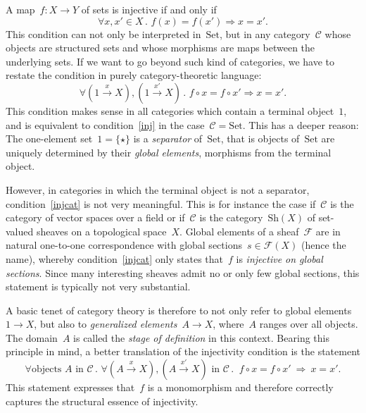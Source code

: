 \documentclass[10pt,reqno,a4paper]{amsbook}
\theoremstyle{definition}
\theoremstyle{plain}
\theoremstyle{remark}
\newcommand{\C}{\mathcal{C}}
\newcommand{\F}{\mathcal{F}}
\newcommand{\Set}{\mathrm{Set}}
\newcommand{\Sh}{\mathrm{Sh}}
\newcommand{\?}{\,{:}\,}
\renewcommand{\_}{\mathpunct{.}\,}
\newcommand{\xra}{\xrightarrow}
\begin{document}
A map~$f : X \to Y$ of sets is injective if and only if
\begin{equation}\label{inj}
  \forall x,x' \in X\_ f(x) = f(x') \Longrightarrow x = x'.
\end{equation}
This condition can not only be interpreted in~$\Set$, but in any category~$\C$ whose
objects are structured sets and whose morphisms are maps between the underlying
sets. If we want to go beyond such kind of categories, we have to restate the
condition in purely category-theoretic language:
\begin{equation}\label{injcat}
  \forall (1 \xra{x} X), (1 \xra{x'} X)\_ f \circ x = f \circ x'
  \Longrightarrow x = x'.
\end{equation}
This condition makes sense in all categories which contain a terminal
object~$1$, and is equivalent to condition~\eqref{inj} in the case~$\C = \Set$.
This has a deeper reason: The one-element set~$1 = \{ \star \}$ is a
\emph{separator} of~$\Set$, that is objects of~$\Set$ are uniquely determined
by their \emph{global elements}, morphisms from the terminal object.

However, in categories in which the terminal object is not a separator,
condition~\eqref{injcat} is not very meaningful. This is for instance the case
if~$\C$ is the category of vector spaces over a field or if~$\C$ is the category~$\Sh(X)$ of set-valued sheaves on a topological
space~$X$. Global elements of a sheaf~$\F$ are in natural one-to-one
correspondence with global sections~$s \in \F(X)$ (hence the name), whereby
condition~\eqref{injcat} only states that~$f$ is \emph{injective on global
sections}. Since many interesting sheaves admit no or only few global sections,
this statement is typically not very substantial.

A basic tenet of category theory is therefore to not only refer to global
elements~$1 \to X$, but also to \emph{generalized elements}~$A \to X$,
where~$A$ ranges over all objects. The domain~$A$ is called the \emph{stage of
definition} in this context. Bearing this principle in mind, a better
translation of the injectivity condition is the statement
\begin{equation}\label{injgen}
  \forall \text{objects $A$ in~$\C$}\_ \forall (A \xra{x} X), (A \xra{x'\!} X) \text{ in~$\C$}\_\
  f \circ x = f \circ x' \ \Longrightarrow\ x = x'.
\end{equation}
This statement expresses that~$f$ is a monomorphism and therefore
correctly captures the structural essence of injectivity.
\end{document}

